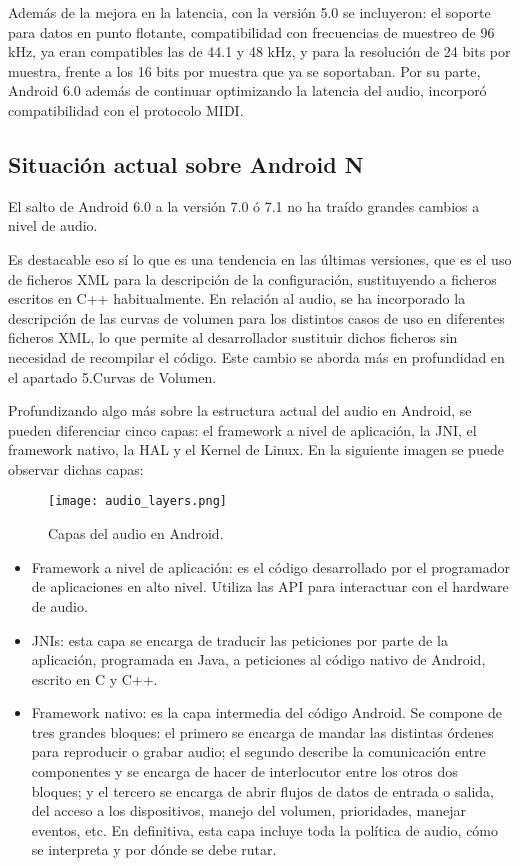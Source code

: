 Además de la mejora en la latencia, con la versión 5.0 se incluyeron: el soporte para datos en punto flotante, compatibilidad con frecuencias de muestreo de 96 kHz, ya eran compatibles las de 44.1 y 48 kHz, y para la resolución de 24 bits por muestra, frente a los 16 bits por muestra que ya se soportaban.
Por su parte, Android 6.0 además de continuar optimizando la latencia del audio, incorporó compatibilidad con el protocolo \gls{MIDI}.


\subsection{Situación actual sobre Android N}
El salto de Android 6.0 a la versión 7.0 ó 7.1 no ha traído grandes cambios a nivel de audio.

Es destacable eso sí lo que es una tendencia en las últimas versiones, que es el uso de ficheros XML para la descripción de la configuración, sustituyendo a ficheros escritos en C++ habitualmente. En relación al audio, se ha incorporado la descripción de las curvas de volumen para los distintos casos de uso en diferentes ficheros XML, lo que permite al desarrollador sustituir dichos ficheros sin necesidad de recompilar el código. Este cambio se aborda más en profundidad en el apartado 5.Curvas de Volumen. %

Profundizando algo más sobre la estructura actual del audio en Android, se pueden diferenciar cinco capas: el framework a nivel de aplicación, la \gls{JNI}, el framework nativo, la \gls{HAL} y el Kernel de Linux. En la siguiente imagen se puede observar dichas capas:

\begin{wrapfigure}{l}{0.47\textwidth}
	\centering
	\texttt{[image: audio\_layers.png]}
	\caption[Capas del audio en Android]{Capas del audio en Android.}
	\label{fig:audio_layers}
\end{wrapfigure}

\hfill

\begin{itemize}
	\item{Framework a nivel de aplicación: es el código desarrollado por el programador de aplicaciones en alto nivel. Utiliza las \gls{API} para interactuar con el hardware de audio.}
	\item{\glspl{JNI}: esta capa se encarga de traducir las peticiones por parte de la aplicación, programada en Java, a peticiones al código nativo de Android, escrito en C y C++.}
	\item{Framework nativo: es la capa intermedia del código Android. Se compone de tres grandes bloques: el primero se encarga de mandar las distintas órdenes para reproducir o grabar audio; el segundo describe la comunicación entre componentes y se encarga de hacer de interlocutor entre los otros dos bloques; y el tercero se encarga de abrir flujos de datos de entrada o salida, del acceso a los dispositivos, manejo del volumen, prioridades, manejar eventos, etc. En definitiva, esta capa incluye toda la política de audio, cómo se interpreta y por dónde se debe rutar.}
\end{itemize}

